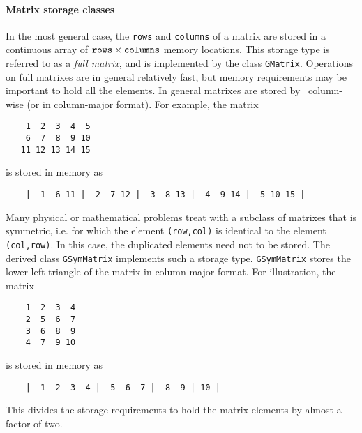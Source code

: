\documentclass{article}[12pt,a4]
\begin{document}
\paragraph{Matrix storage classes}
\label{sec:matrix:storage}

In the most general case, the {\tt rows} and {\tt columns} of a 
matrix are stored in a continuous array of 
${\tt rows} \times {\tt columns}$
memory locations.
This storage type is referred to as a {\em full matrix}, and is 
implemented by the class {\tt GMatrix}.
Operations on full matrixes are in general relatively fast, but 
memory requirements may be important to hold all the elements.
In general matrixes are stored by \this\ column-wise (or in 
column-major format).
For example, the matrix
\begin{verbatim}
    1  2  3  4  5
    6  7  8  9 10
   11 12 13 14 15 
\end{verbatim}
is stored in memory as
\begin{verbatim}
    |  1  6 11 |  2  7 12 |  3  8 13 |  4  9 14 |  5 10 15 |
\end{verbatim}

Many physical or mathematical problems treat with a subclass of 
matrixes that is symmetric, i.e. for which the element
{\tt (row,col)} is identical to the element {\tt (col,row)}.
In this case, the duplicated elements need not to be stored.
The derived class {\tt GSymMatrix} implements such a storage type.
{\tt GSymMatrix} stores the lower-left triangle of the matrix in 
column-major format.
For illustration, the matrix
\begin{verbatim}
    1  2  3  4
    2  5  6  7
    3  6  8  9
    4  7  9 10
\end{verbatim}
is stored in memory as
\begin{verbatim}
    |  1  2  3  4 |  5  6  7 |  8  9 | 10 |
\end{verbatim}
This divides the storage requirements to hold the matrix elements by 
almost a factor of two.
\end{document}
